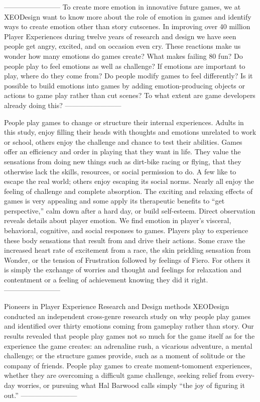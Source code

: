 ------------------------
To create more emotion in innovative future games, we at XEODesign want to know more
about the role of emotion in games and identify ways to create emotion other than story cutscenes. In improving over 40 million Player Experiences during twelve years of research and
design we have seen people get angry, excited, and on occasion even cry. These reactions
make us wonder how many emotions do games create? What makes failing 80%
fun? Do people play to feel emotions as well as challenge? If emotions are important to play,
where do they come from? Do people modify games to feel differently? Is it possible to build
emotions into games by adding emotion-producing objects or actions to game play rather than
cut scenes? To what extent are game developers already doing this?
------------------------

People play games to change or structure their internal experiences. Adults in this study, enjoy filling their heads with thoughts and emotions unrelated to work or school, others enjoy the challenge and chance to test their abilities. Games offer an efficiency and order in playing that they want in life. They value the sensations from doing new things such as dirt-bike racing or flying, that they otherwise lack the skills, resources, or social permission to do. A few like to escape the real world; others enjoy escaping its social norms. Nearly all enjoy the feeling of challenge and complete absorption. The exciting and relaxing effects of games is very appealing and some apply its therapeutic benefits to “get perspective,” calm down after a hard day, or build self-esteem. Direct observation reveals details about player emotion. We find emotion in player’s visceral, behavioral, cognitive, and social responses to games. Players play to experience these body sensations that result from and drive their actions. Some crave the increased heart rate of excitement from a race, the skin prickling sensation from Wonder, or the tension of Frustration followed by feelings of Fiero. For others it is simply the exchange of worries and thought and feelings for relaxation and contentment or a feeling of achievement knowing they did it right.
------------------------

Pioneers in Player Experience Research and Design methods XEODesign conducted an
independent cross-genre research study on why people play games and identified over thirty
emotions coming from gameplay rather than story. Our results revealed that people play
games not so much for the game itself as for the experience the game creates: an adrenaline
rush, a vicarious adventure, a mental challenge; or the structure games provide, such as a
moment of solitude or the company of friends. People play games to create moment-tomoment experiences, whether they are overcoming a difficult game challenge, seeking relief
from every-day worries, or pursuing what Hal Barwood calls simply “the joy of figuring it out.”
------------------------


